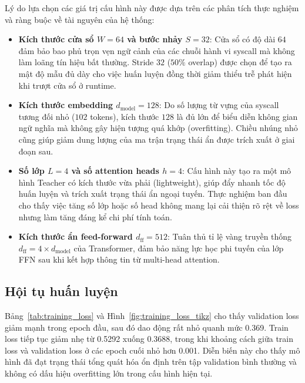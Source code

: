 \documentclass[../main.tex]{subfiles}
\begin{document}
Lý do lựa chọn các giá trị cấu hình này được dựa trên các phân tích thực nghiệm và ràng buộc về tài nguyên của hệ thống:
\begin{itemize}
  \item \textbf{Kích thước cửa sổ $W = 64$ và bước nhảy $S = 32$}: Cửa sổ có độ dài $64$ đảm bảo bao phủ trọn vẹn ngữ cảnh của các chuỗi hành vi \gls{syscall} mà không làm loãng tín hiệu bất thường. Stride $32$ ($50\%$ overlap) được chọn để tạo ra mật độ mẫu đủ dày cho việc huấn luyện đồng thời giảm thiểu trễ phát hiện khi trượt cửa sổ ở runtime.
  \item \textbf{Kích thước embedding $d_{\text{model}} = 128$}: Do số lượng từ vựng của \gls{syscall} tương đối nhỏ ($102$ tokens), kích thước $128$ là đủ lớn để biểu diễn không gian ngữ nghĩa mà không gây hiện tượng quá khớp (overfitting). Chiều nhúng nhỏ cũng giúp giảm dung lượng của ma trận trạng thái ẩn được trích xuất ở giai đoạn sau.
  \item \textbf{Số lớp $L = 4$ và số attention heads $h = 4$}: Cấu hình này tạo ra một mô hình Teacher có kích thước vừa phải (lightweight), giúp đẩy nhanh tốc độ huấn luyện và trích xuất trạng thái ẩn ngoại tuyến. Thực nghiệm ban đầu cho thấy việc tăng số lớp hoặc số head không mang lại cải thiện rõ rệt về loss nhưng làm tăng đáng kể chi phí tính toán.
  \item \textbf{Kích thước ẩn feed-forward $d_{\text{ff}} = 512$}: Tuân thủ tỉ lệ vàng truyền thống $d_{\text{ff}} = 4 \times d_{\text{model}}$ của Transformer, đảm bảo năng lực học phi tuyến của lớp FFN sau khi kết hợp thông tin từ multi-head attention.
\end{itemize}

\subsection{Hội tụ huấn luyện}
\label{subsec:p2_convergence}

Bảng~\ref{tab:training_loss} và Hình~\ref{fig:training_loss_tikz} cho
thấy validation
loss giảm mạnh trong epoch đầu, sau đó dao động rất nhỏ quanh mức
0.369. Train loss tiếp
tục giảm nhẹ từ 0.5292 xuống 0.3688, trong khi khoảng cách giữa train
loss và validation
loss ở các epoch cuối nhỏ hơn 0.001. Diễn biến này cho thấy mô hình
đã đạt trạng thái
tổng quát hóa ổn định trên tập validation bình thường và không có dấu
hiệu overfitting
lớn trong cấu hình hiện tại.
\end{document}
